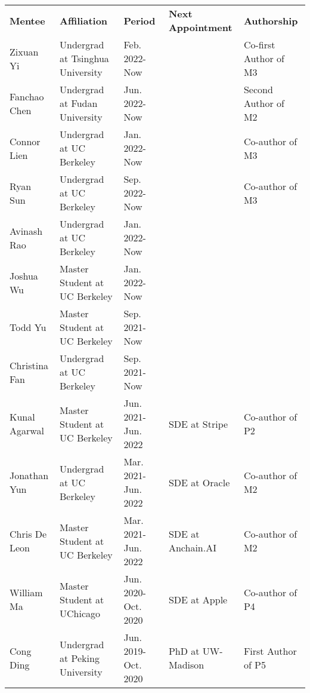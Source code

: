 \documentclass[10pt]{article} %
\begin{document}
\begin{table}[!h]
\hskip-0.2cm
\small
\begin{tabular}{lllll}
\textbf{Mentee} & \textbf{Affiliation}              & \textbf{Period}     & \textbf{Next Appointment} & \textbf{Authorship}   \\
Zixuan Yi     & Undergrad at Tsinghua University & Feb. 2022-Now       &                           & Co-first Author of M3 \\
Fanchao Chen  & Undergrad at Fudan University    & Jun. 2022-Now       &                           & Second Author of M2   \\
Connor Lien   & Undergrad at UC Berkeley         & Jan. 2022-Now       &                           & Co-author of M3       \\
Ryan Sun      & Undergrad at UC Berkeley         & Sep. 2022-Now       &                           & Co-author of M3       \\
Avinash Rao   & Undergrad at UC Berkeley         & Jan. 2022-Now       &                           &                       \\
Joshua Wu     & Master Student at UC Berkeley    & Jan. 2022-Now       &                           &                       \\
Todd Yu       & Master Student at UC Berkeley    & Sep. 2021-Now       &                           &                       \\
Christina Fan & Undergrad at UC Berkeley         & Sep. 2021-Now       &                           &                       \\
Kunal Agarwal & Master Student at UC Berkeley    & Jun. 2021-Jun. 2022 & SDE at Stripe         	& Co-author of P2       \\
Jonathan Yun  & Undergrad at UC Berkeley         & Mar. 2021-Jun. 2022 & SDE at Oracle             & Co-author of M2       \\
Chris De Leon & Master Student at UC Berkeley    & Mar. 2021-Jun. 2022 & SDE at Anchain.AI         & Co-author of M2       \\
William Ma    & Master Student at UChicago       & Jun. 2020-Oct. 2020 & SDE at Apple              & Co-author of P4       \\
Cong Ding     & Undergrad at Peking University   & Jun. 2019-Oct. 2020 & PhD at UW-Madison         & First Author of P5   
\end{tabular}
\end{table}

\vspace{-5mm}
\end{document}
